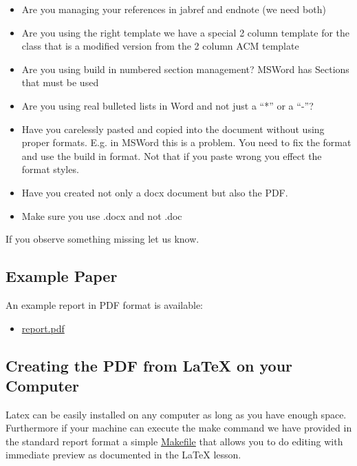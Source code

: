 \begin{itemize}[label=$\Box$] 

\item Are you managing your references in jabref and endnote (we need
  both)
\item Are you using the right template we have a special 2 column
  template for the class that is a modified version from the 2 column
  ACM template
\item Are you using build in numbered section management? MSWord has
  Sections that must be used
\item Are you using real bulleted lists in Word and not just a ``*''
  or a ``-''?
\item Have you carelessly pasted and copied into the document without
  using proper formats. E.g. in MSWord this is a problem. You need to
  fix the format and use the build in format. Not that if you paste
  wrong you effect the format styles.
\item Have you created not only a docx document but also the PDF.

\item Make sure you use .docx and not .doc

\end{itemize}

If you observe something missing let us know.

\subsection{Example Paper}\label{example-paper}

An example report in PDF format is available:

\begin{itemize}

\item
  \href{https://github.com/cloudmesh/classes/blob/master/docs/source/format/report/latex/report.pdf}{report.pdf}
\end{itemize}

\subsection{Creating the PDF from LaTeX on your
Computer}\label{creating-the-pdf-from-latex-on-your-computer}

Latex can be easily installed on any computer as long as you have
enough space. Furthermore if your machine can execute the make command
we have provided in the standard report format a simple
\href{https://github.com/cloudmesh/classes/blob/master/docs/source/format/report/latex/Makefile}{Makefile}
that allows you to do editing with immediate preview as documented in
the LaTeX lesson.

